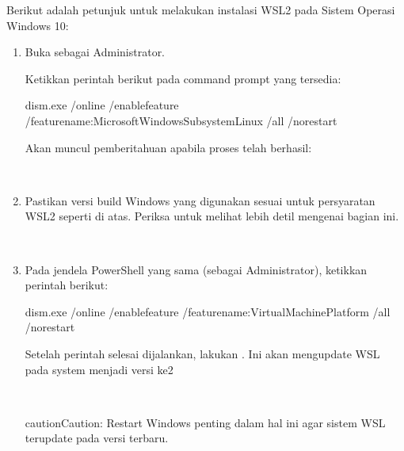 \documentclass[letterpaper,10pt,english]{sphinxmanual}
\begin{document}
Berikut adalah petunjuk untuk melakukan instalasi WSL2 pada Sistem Operasi Windows 10:
\begin{enumerate}
%
\item {} 

Buka  sebagai Administrator.


Ketikkan perintah berikut pada command prompt yang tersedia:

\begin{sphinxVerbatim}[commandchars=\\\{\}]
dism.exe /online /enable\PYGZhy{}feature /featurename:Microsoft\PYGZhy{}Windows\PYGZhy{}Subsystem\PYGZhy{}Linux /all /norestart
\end{sphinxVerbatim}

Akan muncul pemberitahuan apabila proses telah berhasil:


 

\item {} 

Pastikan versi build Windows yang digunakan sesuai untuk persyaratan WSL2 seperti di atas. Periksa  untuk melihat lebih detil mengenai bagian ini.

 

\item {} 

Pada jendela PowerShell yang sama (sebagai Administrator), ketikkan perintah berikut:

\begin{sphinxVerbatim}[commandchars=\\\{\}]
dism.exe /online /enable\PYGZhy{}feature /featurename:VirtualMachinePlatform /all /norestart
\end{sphinxVerbatim}

Setelah perintah selesai dijalankan, lakukan . Ini akan mengupdate WSL pada system menjadi versi ke\sphinxhyphen{}2

 

\begin{sphinxadmonition}{caution}{Caution:}
Restart Windows penting dalam hal ini agar sistem WSL terupdate pada versi terbaru.
\end{sphinxadmonition}


\end{enumerate}
\end{document}
